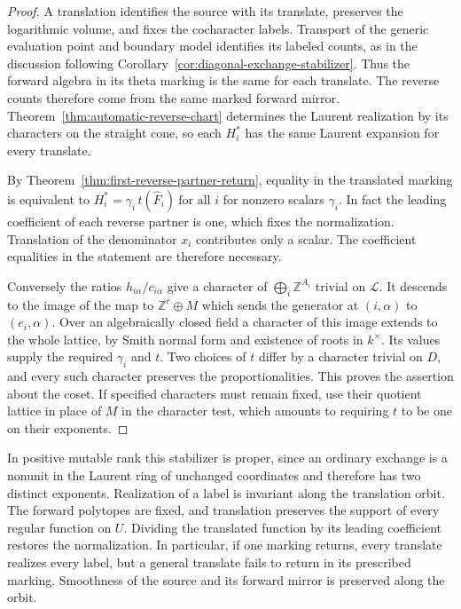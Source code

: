 \documentclass[11pt,reqno]{amsart}
\numberwithin{equation}{section}
\theoremstyle{definition}
\theoremstyle{remark}
\begin{document}
\begin{proof}
A translation identifies the source with its translate, preserves
the logarithmic volume, and fixes the cocharacter labels. Transport
of the generic evaluation point and boundary model identifies its
labeled counts, as in the discussion following
Corollary~\ref{cor:diagonal-exchange-stabilizer}. Thus the forward
algebra in its theta marking is the same for each translate.
The reverse counts therefore come from the same marked forward
mirror. Theorem~\ref{thm:automatic-reverse-chart} determines the
Laurent realization by its characters on the straight cone, so each
\(H_i^*\) has the same Laurent expansion for every translate.

By Theorem~\ref{thm:first-reverse-partner-return}, equality in the
translated marking is equivalent to
\(H_i^*=\gamma_i\,t(\widehat F_i)\ \text{for all }i\)
for nonzero scalars \(\gamma_i\). In fact the leading coefficient
of each reverse partner is one, which fixes the normalization.
Translation of the denominator \(x_i\) contributes only a scalar.
The coefficient equalities in the statement are therefore necessary.

Conversely the ratios \(h_{i\alpha}/c_{i\alpha}\) give a character
of \(\bigoplus_i\mathbb Z^{A_i}\) trivial on \(\mathcal L\). It
descends to the image of the map to \(\mathbb Z^r\oplus M\)
which sends the generator at \((i,\alpha)\) to \((e_i,\alpha)\).
Over an algebraically closed field a character of this image extends
to the whole lattice, by Smith normal form and existence of roots
in \(k^\times\). Its values supply the required \(\gamma_i\) and
\(t\). Two choices of \(t\) differ by a character trivial on \(D\),
and every such character preserves the proportionalities. This
proves the assertion about the coset. If specified characters must
remain fixed, use their quotient lattice in place of \(M\) in the
character test, which amounts to requiring \(t\) to be one on
their exponents.
\end{proof}

In positive mutable rank this stabilizer is proper, since an ordinary
exchange is a nonunit in the Laurent ring of unchanged coordinates
and therefore has two distinct exponents. Realization of a label is
invariant along the translation orbit. The forward polytopes are fixed,
and translation preserves the support of every regular function on \(U\).
Dividing the translated function by its leading coefficient restores
the normalization. In particular, if one marking
returns, every translate realizes every label, but a general translate
fails to return in its prescribed marking. Smoothness of the source and its forward mirror is preserved along the
orbit.
\end{document}
